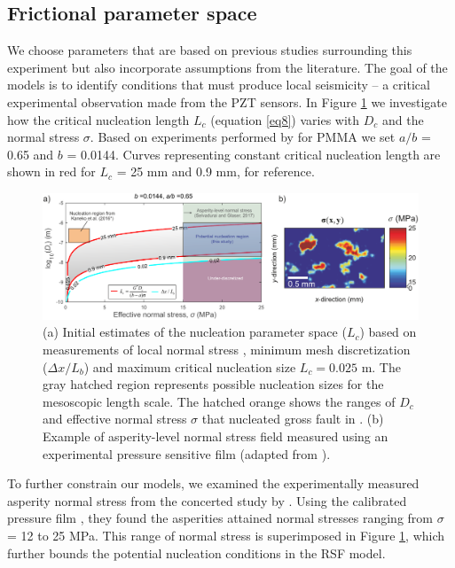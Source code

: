 \documentclass[preprint,1p, 10pt,authoryear]{elsarticle}
\begin{document}
\subsection{Frictional parameter space}
\label{ParameterSpace}
We choose parameters that are based on previous studies surrounding this experiment but also incorporate assumptions from the literature. The goal of the models is to identify conditions that must produce local seismicity -- a critical experimental observation made from the PZT sensors. In Figure \ref{fig4} we investigate how the critical nucleation length $L_{c}$ (equation \eqref{eq8}) varies with $D_{c}$ and the normal stress $\sigma$.  Based on experiments performed by \citet{Berthoude1999} for PMMA we set $a/b$ = 0.65 and $b$ = 0.0144. Curves representing constant critical nucleation length are shown in red for $L_{c}$ = 25 mm and 0.9 mm, for reference.   

\begin{figure}
	\centering
	\includegraphics[scale = 0.95]{FIG4.pdf} 
	\caption{(a) Initial estimates of the nucleation parameter space ($L_{c}$) based on measurements of local normal stress \citep{Selvadurai2017}, minimum mesh discretization ($\Delta x /L_{b}$) and maximum critical nucleation size $L_{c} = 0.025$ m. The gray hatched region represents possible nucleation sizes for the mesoscopic length scale.  The hatched orange shows the ranges of $D_{c}$ and effective normal stress $\sigma$ that nucleated gross fault in \citet[][, *$a/b$ = 0.6944]{Kaneko2016}. (b) Example of asperity-level normal stress field measured using an experimental pressure sensitive film (adapted from \citet{Selvadurai2017}).}
	\label{fig4}
\end{figure}

To further constrain our models, we examined the experimentally measured asperity normal stress from the concerted study by \citet{Selvadurai2017}. Using the calibrated pressure film \citep{Selvadurai2015}, they found the asperities attained normal stresses ranging from $\sigma$ = 12 to 25 MPa. This range of normal stress is superimposed in Figure \ref{fig4}, which further bounds the potential nucleation conditions in the RSF model.
\end{document}
